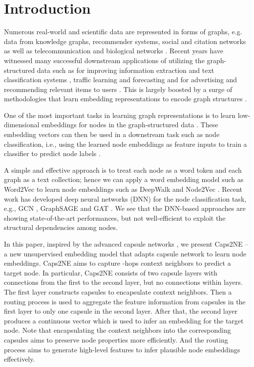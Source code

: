 \documentclass[sigconf]{acmart}
\begin{document}
\section{Introduction}
Numerous real-world and scientific data are represented in forms of graphs, e.g. data  from knowledge graphs, recommender systems,  social and citation networks as well as telecommunication and biological networks  \citep{battaglia2018relational,Chen180802590}. 
Recent years have witnessed many successful downstream applications of utilizing  the graph-structured data such as for improving information extraction and text classification systems \citep{kipf2017semi},  traffic  learning  and forecasting  \citep{Cui1802.07007} and for advertising and recommending relevant items to users \citep{Ying:2018:GCN,Wang:2018:BCE}. This is largely boosted by a  surge  of methodologies  that learn embedding representations to encode graph structures \citep{cai2018comprehensive}. 

One of the most important tasks in learning graph representations is to learn low-dimensional embeddings for nodes in the graph-structured data \citep{zhang2020network}. 
These embedding vectors can then be used in a downstream task such as node classification, i.e., using the learned node embeddings as feature inputs to train a classifier to predict node labels \citep{hamilton2017inductive}. 

A simple and effective approach is to treat each node as a word token and each graph as a text collection; hence we can apply a word embedding model such as Word2Vec \citep{MikolovSCCD13nips} to learn node embeddings such as DeepWalk \citep{Perozzi:2014} and Node2Vec \citep{Grover:2016}.
Recent work has developed deep neural networks (DNN) for the node classification task, e.g., GCN \citep{kipf2017semi}, GraphSAGE \citep{hamilton2017inductive} and GAT \citep{velickovic2018graph}.
We see that the DNN-based approaches are showing state-of-the-art performances, but not well-efficient to exploit the structural dependencies among nodes.

In this paper, inspired by the advanced capsule networks \citep{sabour2017dynamic}, we present Caps2NE -- a new unsupervised embedding model that adapts capsule network to learn node embeddings. Caps2NE aims to capture -hops context neighbors to predict a target node. In particular, Caps2NE consists of two capsule layers with connections from the first to the second layer, but no connections within layers. 
The first layer constructs capsules to encapsulate context neighbors. 
Then a routing process is used to aggregate the feature information from capsules in the first layer to only one capsule in the second layer. 
After that, the second layer produces a continuous vector which is used to infer an embedding for the target node. 
Note that encapsulating the context neighbors into the corresponding capsules aims to preserve node properties more efficiently. 
And the routing process aims to generate high-level features to infer plausible node embeddings effectively. 
\end{document}
